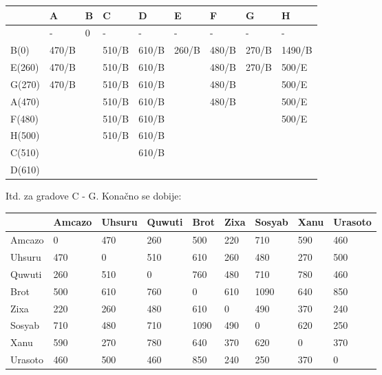 \documentclass[12pt]{article}
\begin{document}
\begin{table}[hp]
\centering
\begin{tabular}{|l|l|l|l|l|l|l|l|l|}
\hline
       & A     & B & C     & D     & E     & F     & G     & H      \\ \hline
       & -     & 0 & -     & -     & -     & -     & -     & -      \\ \hline
B(0)   & 470/B &   & 510/B & 610/B & 260/B & 480/B & 270/B & 1490/B \\ \hline
E(260) & 470/B &   & 510/B & 610/B &       & 480/B & 270/B & 500/E  \\ \hline
G(270) & 470/B &   & 510/B & 610/B &       & 480/B &       & 500/E  \\ \hline
A(470) &       &   & 510/B & 610/B &       & 480/B &       & 500/E  \\ \hline
F(480) &       &   & 510/B & 610/B &       &       &       & 500/E  \\ \hline
H(500) &       &   & 510/B & 610/B &       &       &       &        \\ \hline
C(510) &       &   &       & 610/B &       &       &       &        \\ \hline
D(610) &       &   &       &       &       &       &       &        \\ \hline
\end{tabular}
\end{table}
\newpage
Itd. za gradove C - G. Konačno se dobije:

\begin{table}[hp]
\centering
\begin{tabular}{|l|l|l|l|l|l|l|l|l|}
\hline
 & Amcazo & Uhsuru & Quwuti & Brot & Zixa & Sosyab & Xanu & Urasoto \\ \hline
Amcazo & 0 & 470 & 260 & 500 & 220 & 710 & 590 & 460 \\ \hline
Uhsuru & 470 & 0 & 510 & 610 & 260 & 480 & 270 & 500 \\ \hline
Quwuti & 260 & 510 & 0 & 760 & 480 & 710 & 780 & 460 \\ \hline
Brot & 500 & 610 & 760 & 0 & 610 & 1090 & 640 & 850 \\ \hline
Zixa & 220 & 260 & 480 & 610 & 0 & 490 & 370 & 240 \\ \hline
Sosyab & 710 & 480 & 710 & 1090 & 490 & 0 & 620 & 250 \\ \hline
Xanu & 590 & 270 & 780 & 640 & 370 & 620 & 0 & 370 \\ \hline
Urasoto & 460 & 500 & 460 & 850 & 240 & 250 & 370 & 0 \\ \hline
\end{tabular}
\end{table}
\end{document}
